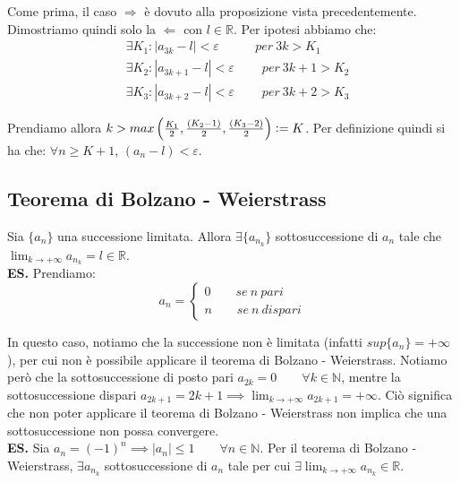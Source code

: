 \documentclass{article}
\begin{document}
\noindent Come prima, il caso $\Rightarrow$ è dovuto alla proposizione vista precedentemente. Dimostriamo quindi solo la $\Leftarrow$ con $l \in \mathbb{R}$. Per ipotesi abbiamo che:
\begin{align*}
    & \exists K_1 : |a_{3k} - l| < \varepsilon \qquad \ \ \ \ per \ 3k > K_1 \\
    & \exists K_2 : |a_{3k + 1} - l| < \varepsilon \qquad \ per \ 3k + 1 > K_2 \\
    & \exists K_3 : |a_{3k + 2} - l| < \varepsilon \qquad \ per \ 3k + 2 > K_3
\end{align*}

\noindent Prendiamo allora $k > max\left(\frac{K_1}{2}, \frac{(K_2 - 1)}{2}, \frac{(K_3 - 2)}{2}\right) \vcentcolon = K$. Per definizione quindi si ha che: $\forall n \geq K + 1$, $(a_n - l) < \varepsilon$.

\subsection{Teorema di Bolzano - Weierstrass}
Sia $\{a_n\}$ una successione limitata. Allora $\exists \{a_{n_k}\}$ sottosuccessione di $a_n$ tale che $\lim_{k \to +\infty} a_{n_k} = l \in \mathbb{R}$.\\

\noindent\textbf{ES.} Prendiamo:
\begin{equation*}
  a_n = \begin{cases}
    0 \qquad se \ n \ pari \\
    n \qquad se \ n \ dispari
  \end{cases}
\end{equation*}

\noindent In questo caso, notiamo che la successione non è limitata (infatti $sup\{a_n\} = +\infty$), per cui non è possibile applicare il teorema di Bolzano - Weierstrass. Notiamo però che la sottosuccessione di posto pari $a_{2k} = 0 \qquad \forall k \in \mathbb{N}$, mentre la sottosuccessione dispari $a_{2k + 1} = 2k + 1 \implies \lim_{k \to +\infty} a_{2k + 1} = +\infty$. Ciò significa che non poter applicare il teorema di Bolzano - Weierstrass non implica che una sottosuccessione non possa convergere.\\

\noindent\textbf{ES.} Sia $a_n = (-1)^n \implies |a_n| \leq 1 \qquad \forall n \in \mathbb{N}$. Per il teorema di Bolzano - Weierstrass, $\exists a_{n_k}$ sottosuccessione di $a_n$ tale per cui $\exists \lim_{k \to +\infty} a_{n_k} \in \mathbb{R}$.\\
\end{document}
